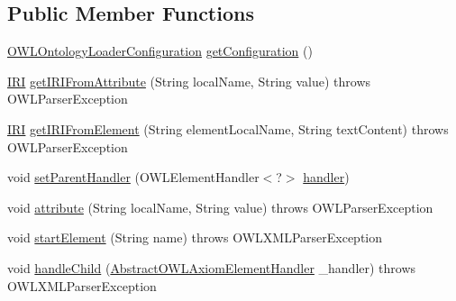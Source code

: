 \subsection*{Public Member Functions}
\begin{DoxyCompactItemize}
\item 
\hyperlink{classorg_1_1semanticweb_1_1owlapi_1_1model_1_1_o_w_l_ontology_loader_configuration}{O\-W\-L\-Ontology\-Loader\-Configuration} \hyperlink{classorg_1_1coode_1_1owlapi_1_1owlxmlparser_1_1_abstract_o_w_l_element_handler_3_01_o_01_4_a815cb36bac68a7795854d51c5f00b496}{get\-Configuration} ()
\item 
\hyperlink{classorg_1_1semanticweb_1_1owlapi_1_1model_1_1_i_r_i}{I\-R\-I} \hyperlink{classorg_1_1coode_1_1owlapi_1_1owlxmlparser_1_1_abstract_o_w_l_element_handler_3_01_o_01_4_ae7ee6a459dd344a51f65adde563b4600}{get\-I\-R\-I\-From\-Attribute} (String local\-Name, String value)  throws O\-W\-L\-Parser\-Exception 
\item 
\hyperlink{classorg_1_1semanticweb_1_1owlapi_1_1model_1_1_i_r_i}{I\-R\-I} \hyperlink{classorg_1_1coode_1_1owlapi_1_1owlxmlparser_1_1_abstract_o_w_l_element_handler_3_01_o_01_4_a24ef101e4998bc287dff16a8bf98d334}{get\-I\-R\-I\-From\-Element} (String element\-Local\-Name, String text\-Content)  throws O\-W\-L\-Parser\-Exception 
\item 
void \hyperlink{classorg_1_1coode_1_1owlapi_1_1owlxmlparser_1_1_abstract_o_w_l_element_handler_3_01_o_01_4_a263cb470c573352616b0d272c4fd7e61}{set\-Parent\-Handler} (O\-W\-L\-Element\-Handler$<$?$>$ \hyperlink{classorg_1_1coode_1_1owlapi_1_1owlxmlparser_1_1_abstract_o_w_l_element_handler_3_01_o_01_4_a31af09b1e669cbfabf238feed83333e0}{handler})
\item 
void \hyperlink{classorg_1_1coode_1_1owlapi_1_1owlxmlparser_1_1_abstract_o_w_l_element_handler_3_01_o_01_4_a42543e28b168fa720b967baca195ad9a}{attribute} (String local\-Name, String value)  throws O\-W\-L\-Parser\-Exception 
\item 
void \hyperlink{classorg_1_1coode_1_1owlapi_1_1owlxmlparser_1_1_abstract_o_w_l_element_handler_3_01_o_01_4_a3fe2d9ba08b3cdaf8eb92030f7dbf03e}{start\-Element} (String name)  throws O\-W\-L\-X\-M\-L\-Parser\-Exception 
\item 
void \hyperlink{classorg_1_1coode_1_1owlapi_1_1owlxmlparser_1_1_abstract_o_w_l_element_handler_3_01_o_01_4_a33ce9d140019231b83ab979af8b978cc}{handle\-Child} (\hyperlink{classorg_1_1coode_1_1owlapi_1_1owlxmlparser_1_1_abstract_o_w_l_axiom_element_handler}{Abstract\-O\-W\-L\-Axiom\-Element\-Handler} \-\_\-handler)  throws O\-W\-L\-X\-M\-L\-Parser\-Exception 

\end{DoxyCompactItemize}
